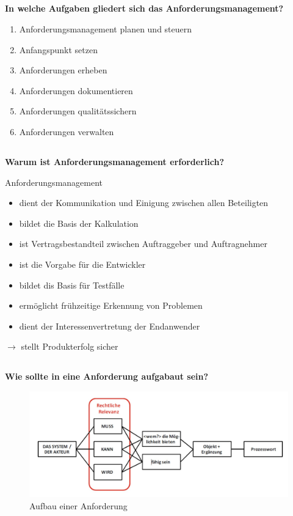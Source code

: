 \subsection{}
\textbf{In welche Aufgaben gliedert sich das Anforderungsmanagement?}
\begin{enumerate}
    \item Anforderungsmanagement planen und steuern
    \item Anfangspunkt setzen
    \item Anforderungen erheben
    \item Anforderungen dokumentieren
    \item Anforderungen qualitätssichern
    \item Anforderungen verwalten
\end{enumerate}
\subsection{}
\textbf{Warum ist Anforderungsmanagement erforderlich?}

Anforderungsmanagement
\begin{itemize}
    \item dient der Kommunikation und Einigung zwischen allen Beteiligten
    \item bildet die Basis der Kalkulation
    \item ist Vertragsbestandteil zwischen Auftraggeber und Auftragnehmer
    \item ist die Vorgabe für die Entwickler
    \item bildet dis Basis für Testfälle
    \item ermöglicht frühzeitige Erkennung von Problemen
    \item dient der Interessenvertretung der Endanwender
\end{itemize}
$\rightarrow$ stellt Produkterfolg sicher
\subsection{}
\textbf{Wie sollte in eine Anforderung aufgabaut sein?}
\begin{figure}[H]
    \centering
    \includegraphics[width=.8\linewidth]{Graphics/Anforderung_Aufbau.jpg}
    \caption{Aufbau einer Anforderung}
\end{figure}